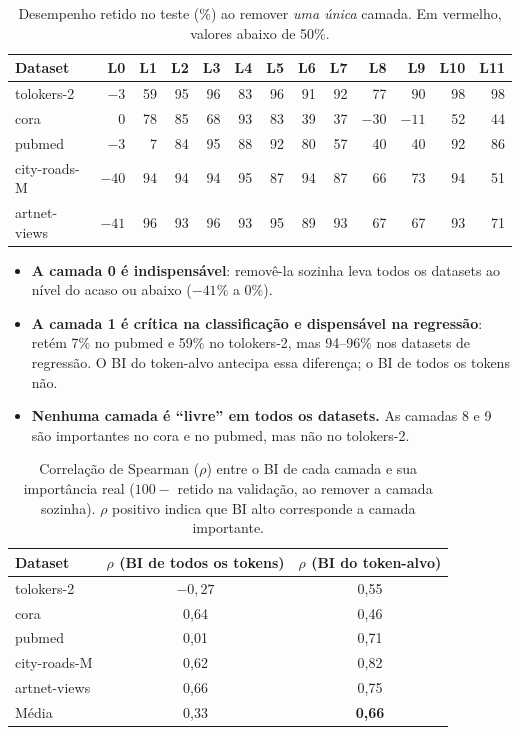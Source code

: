 \documentclass[12pt,a4paper]{article}
\newcommand{\bom}[1]{\textbf{#1}}
\newcommand{\ruim}[1]{\textcolor{red!70!black}{#1}}
\begin{document}
\begin{table}[H]
\centering
\caption{Desempenho retido no teste (\%) ao remover \emph{uma única} camada. Em vermelho, valores abaixo de 50\%.}
\label{tab:gpfn-loo}
\setlength{\tabcolsep}{3.6pt}
\small
\begin{tabular}{@{}l*{12}{r}@{}}
\toprule
Dataset & L0 & L1 & L2 & L3 & L4 & L5 & L6 & L7 & L8 & L9 & L10 & L11 \\
\midrule
tolokers-2   & \ruim{$-3$}  & 59 & 95 & 96 & 83 & 96 & 91 & 92 & 77 & 90 & 98 & 98 \\
cora         & \ruim{0}     & 78 & 85 & 68 & 93 & 83 & \ruim{39} & \ruim{37} & \ruim{$-30$} & \ruim{$-11$} & 52 & \ruim{44} \\
pubmed       & \ruim{$-3$}  & \ruim{7} & 84 & 95 & 88 & 92 & 80 & 57 & \ruim{40} & \ruim{40} & 92 & 86 \\
city-roads-M & \ruim{$-40$} & 94 & 94 & 94 & 95 & 87 & 94 & 87 & 66 & 73 & 94 & 51 \\
artnet-views & \ruim{$-41$} & 96 & 93 & 96 & 93 & 95 & 89 & 93 & 67 & 67 & 93 & 71 \\
\bottomrule
\end{tabular}
\end{table}

\begin{itemize}
  \item \textbf{A camada 0 é indispensável}: removê-la sozinha leva todos os datasets ao nível do acaso ou abaixo ($-41\%$ a 0\%).
  \item \textbf{A camada 1 é crítica na classificação e dispensável na regressão}: retém 7\% no pubmed e 59\% no tolokers-2, mas 94--96\% nos datasets de regressão. O BI do token-alvo antecipa essa diferença; o BI de todos os tokens não.
  \item \textbf{Nenhuma camada é ``livre'' em todos os datasets.} As camadas 8 e 9 são importantes no cora e no pubmed, mas não no tolokers-2.
\end{itemize}

\begin{table}[H]
\centering
\caption{Correlação de Spearman ($\rho$) entre o BI de cada camada e sua importância real ($100 -$ retido na validação, ao remover a camada sozinha). $\rho$ positivo indica que BI alto corresponde a camada importante.}
\label{tab:gpfn-corr}
\begin{tabular}{@{}lcc@{}}
\toprule
Dataset & $\rho$ (BI de todos os tokens) & $\rho$ (BI do token-alvo) \\
\midrule
tolokers-2   & \ruim{$-0{,}27$} & 0,55 \\
cora         & 0,64  & 0,46 \\
pubmed       & 0,01  & 0,71 \\
city-roads-M & 0,62  & 0,82 \\
artnet-views & 0,66  & 0,75 \\
\midrule
Média        & 0,33  & \bom{0,66} \\
\bottomrule
\end{tabular}
\end{table}
\end{document}
